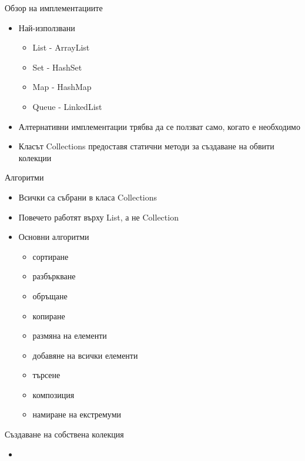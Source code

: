 \documentclass{beamer}
\begin{document}
\begin{frame}{Обзор на имплементациите}
  \transdissolve
  \begin{itemize}
  \item Най-използвани
    \begin{itemize}
      \item List - ArrayList
      \item Set - HashSet
      \item Map - HashMap
      \item Queue - LinkedList   
    \end{itemize}
    \item Алтернативни имплементации трябва да се ползват само, когато
      е необходимо
    \item Класът Collections предоставя статични методи за създаване
      на обвити колекции
  \end{itemize}
\end{frame}


\begin{frame}{Алгоритми}
  \transdissolve
  \begin{itemize}
  \item Всички са събрани в класа Collections
  \item Повечето работят върху List, а не Collection
  \item Основни алгоритми
    \begin{itemize}
      \item сортиране
      \item разбъркване
      \item обръщане
      \item копиране
      \item размяна на елементи
      \item добавяне на всички елементи
      \item търсене
      \item композиция
      \item намиране на екстремуми
    \end{itemize}

  \end{itemize}
\end{frame}

\begin{frame}{Създаване на собствена колекция}
  \transdissolve
  \begin{itemize}
  \item 
  \end{itemize}
\end{frame}
\end{document}
